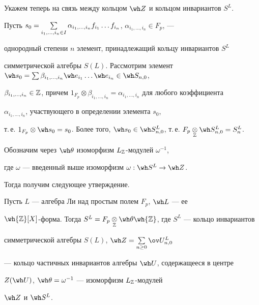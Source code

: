  


Укажем теперь на связь между кольцом $\wh Z$ и кольцом инвариантов $S^L$. 


Пусть $s_0=\linebreak


\sum\limits_{i_1,\dotsc,i_n\in I} \alpha_{i_1,\dotsc, i_n} 


f_{i_1}\dotsc f_{i_n}$, $\alpha_{i_1,\dotsc,i_n}\in F_p$, --- 


однородный степени $n$ элемент, принадлежащий кольцу инвариантов $S^L$ 


симметрической алгебры $S(L)$. Рассмотрим элемент $\wh s_0= \sum 


\beta_{i_1,\dotsc,i_n}\wh e_{i_1}\dotsc\wh e_{i_n}\in\wh S_{n,0}$, 


$\beta_{i_1,\dotsc,i_n}\in\Bbb Z$, причем $1_{F_p}\otimes 


\beta_{i_1,\dotsc,i_n}=\alpha_{i_1,\dotsc,i_n}$ для любого коэффициента 


$\alpha_{i_1,\dotsc,i_n}$, участвующего в определении элемента $s_0$, 


т.\,е. $1_{F_p}\otimes\wh s_0=s_0$. Более того, $\wh s_0\in\wh 


S^L_{n,0}$, т.\,е. $F_p\down{\Bbb Z}{\otimes}\wh S^L_{n,0}=S^L_n$. 


Обозначим через $\wh\theta$ изоморфизм $L_{\Bbb Z}$-модулей $\omega^{-1}$, 


где $\omega$ --- введенный выше изоморфизм $\omega:\wh S^L\to \wh Z$. 


Тогда получим следующее утверждение. 


 


\begin{thm} 


Пусть $L$ --- алгебра Ли над простым полем $F_p$, $\wh L$ --- ее 


$\wh{\Bbb Z}[X]$-форма. Тогда $S^L=F_p\down{\Bbb 


Z}{\otimes}\wh\theta\wh{\Bbb Z}$, где $S^L$ --- кольцо инвариантов 


симметрической алгебры $S(L)$, $\wh Z=\sum\limits_{n\ge0}\ov U^L_{n,0}$ 


--- кольцо частичных инвариантов алгебры $\wh U$, содержащееся в центре 


$Z(\wh U)$, $\wh\theta=\omega^{-1}$ --- изоморфизм $L_{\Bbb Z}$-модулей 


$\wh Z$ и $\wh S^L$. 


\end{thm} 


